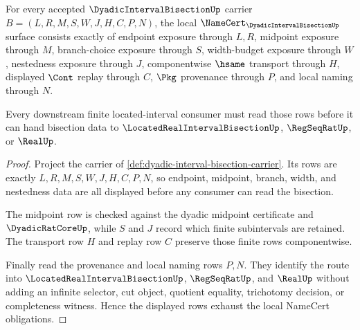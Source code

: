 \begin{theorem}
\label{thm:dyadic-interval-bisection-namecert-obligations}
For every accepted $\DyadicIntervalBisectionUp$ carrier $B=(L,R,M,S,W,J,H,C,P,N)$, the local $\NameCert_{\DyadicIntervalBisectionUp}$ surface consists exactly of endpoint exposure through $L,R$, midpoint exposure through $M$, branch-choice exposure through $S$, width-budget exposure through $W$, nestedness exposure through $J$, componentwise $\hsame$ transport through $H$, displayed $\Cont$ replay through $C$, $\Pkg$ provenance through $P$, and local naming through $N$.

Every downstream finite located-interval consumer must read those rows before it can hand bisection data to $\LocatedRealIntervalBisectionUp$, $\RegSeqRatUp$, or $\RealUp$.
\end{theorem}
\begin{proof}
Project the carrier of \autoref{def:dyadic-interval-bisection-carrier}. Its rows are exactly $L,R,M,S,W,J,H,C,P,N$, so endpoint, midpoint, branch, width, and nestedness data are all displayed before any consumer can read the bisection.

The midpoint row is checked against the dyadic midpoint certificate and $\DyadicRatCoreUp$, while $S$ and $J$ record which finite subintervals are retained. The transport row $H$ and replay row $C$ preserve those finite rows componentwise.

Finally read the provenance and local naming rows $P,N$. They identify the route into $\LocatedRealIntervalBisectionUp$, $\RegSeqRatUp$, and $\RealUp$ without adding an infinite selector, cut object, quotient equality, trichotomy decision, or completeness witness. Hence the displayed rows exhaust the local NameCert obligations.
\end{proof}

